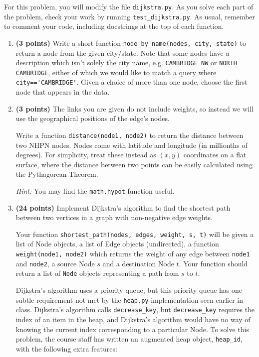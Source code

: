\documentclass[12pt,twoside]{article}
\begin{document}
\begin{enumerate}
  For this problem, you will modify the file \verb|dijkstra.py|. As
  you solve each part of the problem, check your work by running
  \verb|test_dijkstra.py|. As usual, remember to comment your code,
  including docstrings at the top of each function.

  \begin{enumerate}
  \item {\bf (3 points)} Write a short function
    \verb|node_by_name(nodes, city, state)| to return a node from the
    given city/state. Note that some nodes have a description which
    isn't solely the city name, e.g. \verb|CAMBRIDGE NW| or
    \verb|NORTH CAMBRIDGE|, either of which we would like to match a
    query where \verb|city=='CAMBRIDGE'|. Given a choice of more than
    one node, choose the first node that appears in the data.

  \item {\bf (3 points)} The links you are given do not include
    weights, so instead we will use the geographical positions of the
    edge's nodes.

    Write a function \verb|distance(node1, node2)| to return the
    distance between two NHPN nodes. Nodes come with latitude and
    longitude (in millionths of degrees). For simplicity, treat these
    instead as $(x, y)$ coordinates on a flat surface, where the
    distance between two points can be easily calculated using the
    Pythagorean Theorem.
    
    \emph{Hint:} You may find the \verb|math.hypot| function useful.

  \item {\bf (24 points)} Implement Dijkstra's algorithm to find the
    shortest path between two vertices in a graph with non-negative
    edge weights.

    Your function \verb|shortest_path(nodes, edges, weight, s, t)|
    will be given a list of Node objects, a list of Edge objects
    (undirected), a function \\ \verb|weight(node1, node2)| which
    returns the weight of any edge between \verb|node1| and
    \verb|node2|, a source Node $s$ and a destination Node $t$. Your
    function should return a list of \verb|Node| objects representing
    a path from $s$ to $t$.

    Dijkstra's algorithm uses a priority queue, but this priority
    queue has one subtle requirement not met by the \verb|heap.py|
    implementation seen earlier in class. Dijkstra's algorithm calls
    \verb|decrease_key|, but \verb|decrease_key| requires the index of
    an item in the heap, and Dijkstra's algorithm would have no way of
    knowing the current index corresponding to a particular Node. To
    solve this problem, the course staff has written an augmented heap
    object, \verb|heap_id|, with the following extra features:


\end{enumerate}
\end{enumerate}
\end{document}
